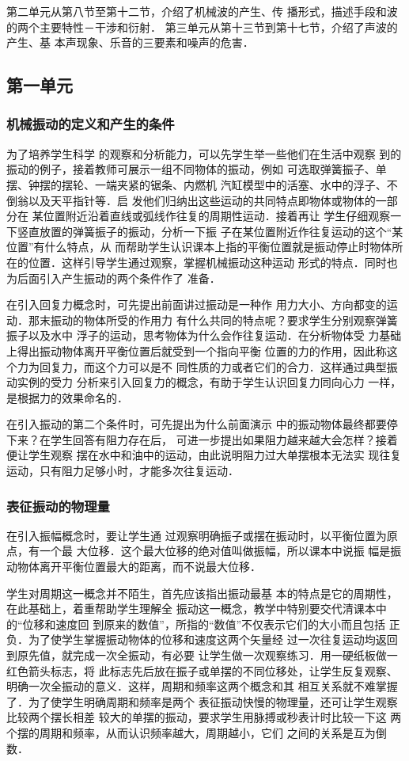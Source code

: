 第二单元从第八节至第十二节，介绍了机械波的产生、传
播形式，描述手段和波的两个主要特性－干涉和衍射．
第三单元从第十三节到第十七节，介绍了声波的产生、基
本声现象、乐音的三要素和噪声的危害．

\subsection{第一单元}
\subsubsection{机械振动的定义和产生的条件}

为了培养学生科学
的观察和分析能力，可以先学生举一些他们在生活中观察
到的振动的例子，接着教师可展示一组不同物体的振动，例如
可选取弹簧振子、单摆、钟摆的摆轮、一端夹紧的锯条、内燃机
汽缸模型中的活塞、水中的浮子、不倒翁以及天平指针等．启
发他们归纳出这些运动的共同特点即物体或物体的一部分在
某位置附近沿着直线或弧线作往复的周期性运动．接着再让
学生仔细观察一下竖直放置的弹簧振子的振动，分析一下振
子在某位置附近作往复运动的这个“某位置”有什么特点，从
而帮助学生认识课本上指的平衡位置就是振动停止时物体所
在的位置．这样引导学生通过观察，掌握机械振动这种运动
形式的特点．同时也为后面引入产生振动的两个条件作了
准备．

在引入回复力概念时，可先提出前面讲过振动是一种作
用力大小、方向都变的运动．那末振动的物体所受的作用力
有什么共同的特点呢？要求学生分别观察弹簧振子以及水中
浮子的运动，思考物体为什么会作往复运动．在分析物体受
力基础上得出振动物体离开平衡位置后就受到一个指向平衡
位置的力的作用，因此称这个力为回复力，而这个力可以是不
同性质的力或者它们的合力．这样通过典型振动实例的受力
分析来引入回复力的概念，有助于学生认识回复力同向心力
一样，是根据力的效果命名的．

在引入振动的第二个条件时，可先提出为什么前面演示
中的振动物体最终都要停下来？在学生回答有阻力存在后，
可进一步提出如果阻力越来越大会怎样？接着便让学生观察
摆在水中和油中的运动，由此说明阻力过大单摆根本无法实
现往复运动，只有阻力足够小时，才能多次往复运动．

\subsubsection{表征振动的物理量}
在引入振幅概念时，要让学生通
过观察明确振子或摆在振动时，以平衡位置为原点，有一个最
大位移．这个最大位移的绝对值叫做振幅，所以课本中说振
幅是振动物体离开平衡位置最大的距离，而不说最大位移．

学生对周期这一概念并不陌生，首先应该指出振动最基
本的特点是它的周期性，在此基础上，着重帮助学生理解全
振动这一概念，教学中特别要交代清课本中的“位移和速度回
到原来的数值”，所指的“数值”不仅表示它们的大小而且包括
正负．为了使学生掌握振动物体的位移和速度这两个矢量经
过一次往复运动均返回到原先值，就完成一次全振动，有必要
让学生做一次观察练习．用一硬纸板做一红色箭头标志，将
此标志先后放在振子或单摆的不同位移处，让学生反复观察、
明确一次全振动的意义．这样，周期和频率这两个概念和其
相互关系就不难掌握了．为了使学生明确周期和频率是两个
表征振动快慢的物理量，还可让学生观察比较两个摆长相差
较大的单摆的振动，要求学生用脉搏或秒表计时比较一下这
两个摆的周期和频率，从而认识频率越大，周期越小，它们
之间的关系是互为倒数．

